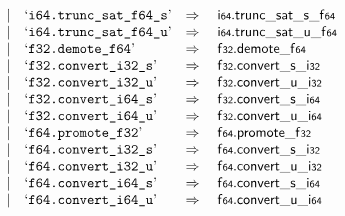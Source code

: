 $$\begin{array}[t]{@{}lrrl@{}l@{}l@{}l@{}}
& & | & \mbox{‘\texttt{i64.trunc\_sat\_f64\_s}’} & \quad\Rightarrow\quad{} & \mathsf{i{\scriptstyle 64}} {.} {{\mathsf{trunc\_sat}}{\mathsf{\_}}{\mathsf{s}}}{\mathsf{\_}}{\mathsf{f{\scriptstyle 64}}} \\
& & | & \mbox{‘\texttt{i64.trunc\_sat\_f64\_u}’} & \quad\Rightarrow\quad{} & \mathsf{i{\scriptstyle 64}} {.} {{\mathsf{trunc\_sat}}{\mathsf{\_}}{\mathsf{u}}}{\mathsf{\_}}{\mathsf{f{\scriptstyle 64}}} \\
& & | & \mbox{‘\texttt{f32.demote\_f64}’} & \quad\Rightarrow\quad{} & \mathsf{f{\scriptstyle 32}} {.} {\mathsf{demote}}{\mathsf{\_}}{\mathsf{f{\scriptstyle 64}}} \\
& & | & \mbox{‘\texttt{f32.convert\_i32\_s}’} & \quad\Rightarrow\quad{} & \mathsf{f{\scriptstyle 32}} {.} {{\mathsf{convert}}{\mathsf{\_}}{\mathsf{s}}}{\mathsf{\_}}{\mathsf{i{\scriptstyle 32}}} \\
& & | & \mbox{‘\texttt{f32.convert\_i32\_u}’} & \quad\Rightarrow\quad{} & \mathsf{f{\scriptstyle 32}} {.} {{\mathsf{convert}}{\mathsf{\_}}{\mathsf{u}}}{\mathsf{\_}}{\mathsf{i{\scriptstyle 32}}} \\
& & | & \mbox{‘\texttt{f32.convert\_i64\_s}’} & \quad\Rightarrow\quad{} & \mathsf{f{\scriptstyle 32}} {.} {{\mathsf{convert}}{\mathsf{\_}}{\mathsf{s}}}{\mathsf{\_}}{\mathsf{i{\scriptstyle 64}}} \\
& & | & \mbox{‘\texttt{f32.convert\_i64\_u}’} & \quad\Rightarrow\quad{} & \mathsf{f{\scriptstyle 32}} {.} {{\mathsf{convert}}{\mathsf{\_}}{\mathsf{u}}}{\mathsf{\_}}{\mathsf{i{\scriptstyle 64}}} \\
& & | & \mbox{‘\texttt{f64.promote\_f32}’} & \quad\Rightarrow\quad{} & \mathsf{f{\scriptstyle 64}} {.} {\mathsf{promote}}{\mathsf{\_}}{\mathsf{f{\scriptstyle 32}}} \\
& & | & \mbox{‘\texttt{f64.convert\_i32\_s}’} & \quad\Rightarrow\quad{} & \mathsf{f{\scriptstyle 64}} {.} {{\mathsf{convert}}{\mathsf{\_}}{\mathsf{s}}}{\mathsf{\_}}{\mathsf{i{\scriptstyle 32}}} \\
& & | & \mbox{‘\texttt{f64.convert\_i32\_u}’} & \quad\Rightarrow\quad{} & \mathsf{f{\scriptstyle 64}} {.} {{\mathsf{convert}}{\mathsf{\_}}{\mathsf{u}}}{\mathsf{\_}}{\mathsf{i{\scriptstyle 32}}} \\
& & | & \mbox{‘\texttt{f64.convert\_i64\_s}’} & \quad\Rightarrow\quad{} & \mathsf{f{\scriptstyle 64}} {.} {{\mathsf{convert}}{\mathsf{\_}}{\mathsf{s}}}{\mathsf{\_}}{\mathsf{i{\scriptstyle 64}}} \\
& & | & \mbox{‘\texttt{f64.convert\_i64\_u}’} & \quad\Rightarrow\quad{} & \mathsf{f{\scriptstyle 64}} {.} {{\mathsf{convert}}{\mathsf{\_}}{\mathsf{u}}}{\mathsf{\_}}{\mathsf{i{\scriptstyle 64}}} \\

\end{array}$$
